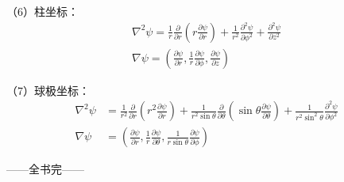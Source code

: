 （6）柱坐标：
\begin{gather*}
\nabla^{2}\psi = \frac{1}{r}\frac{\partial}{\partial r}\left(r\frac{\partial\psi}{\partial r}\right) + \frac{1}{r^{2}}\frac{\partial^{2}\psi}{\partial\phi^{2}} + \frac{\partial^{2}\psi}{\partial z^{2}}\\
\nabla\psi = \left(\frac{\partial\psi}{\partial r}, \frac{1}{r}\frac{\partial\psi}{\partial\phi}, \frac{\partial\psi}{\partial z}\right)
\end{gather*}

（7）球极坐标：
\begin{align*}
\nabla^{2}\psi &= \frac{1}{r^{2}}\frac{\partial}{\partial r}\left(r^{2}\frac{\partial\psi}{\partial r}\right) + \frac{1}{r^{2}\sin\theta}\frac{\partial}{\partial\theta}\left(\sin\theta\frac{\partial\psi}{\partial\theta}\right) + \frac{1}{r^{2}\sin^{2}\theta}\frac{\partial^{2}\psi}{\partial\phi^{2}}\\
\nabla\psi &= \left(\frac{\partial\psi}{\partial r}, \frac{1}{r}\frac{\partial\psi}{\partial\theta}, \frac{1}{r\sin\theta}\frac{\partial\psi}{\partial\phi}\right)
\end{align*}

\vspace{2em}
\begin{center}
\small\kaishu ——全书完——
\end{center}
